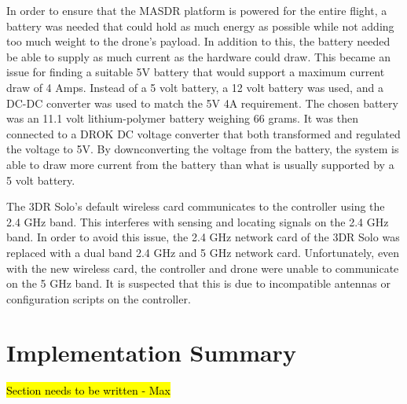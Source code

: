 In order to ensure that the MASDR platform is powered for the entire flight, a battery was needed that could hold as much energy as possible while not adding too much weight to the drone’s payload. In addition to this, the battery needed be able to supply as much current as the hardware could draw. This became an issue for finding a suitable 5V battery that would support a maximum current draw of 4 Amps. Instead of a 5 volt battery, a 12 volt battery was used, and a DC-DC converter was used to match the 5V 4A requirement. The chosen battery was an 11.1 volt lithium-polymer battery weighing 66 grams. It was then connected to a DROK DC voltage converter that both transformed and regulated the voltage to 5V. By downconverting the voltage from the battery, the system is able to draw more current from the battery than what is usually supported by a 5 volt battery. \par
The 3DR Solo’s default wireless card communicates to the controller using the 2.4 GHz band. This interferes with sensing and locating signals on the 2.4 GHz band. In order to avoid this issue, the 2.4 GHz network card of the 3DR Solo was replaced with a dual band 2.4 GHz and 5 GHz network card. Unfortunately, even with the new wireless card, the controller and drone were unable to communicate on the 5 GHz band. It is suspected that this is due to incompatible antennas or configuration scripts on the controller.

\section{Implementation Summary}
\hl{Section needs to be written - Max}

